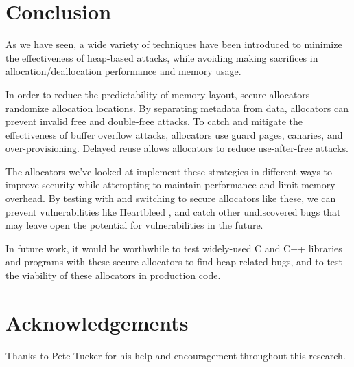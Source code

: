 \documentclass[conference]{IEEEtran}
\begin{document}
\section{Conclusion}

As we have seen, a wide variety of techniques have been introduced to minimize the effectiveness of heap-based attacks, while avoiding making sacrifices in allocation/deallocation performance and memory usage.

In order to reduce the predictability of memory layout, secure allocators randomize allocation locations.
By separating metadata from data, allocators can prevent invalid free and double-free attacks.
To catch and mitigate the effectiveness of buffer overflow attacks, allocators use guard pages, canaries, and over-provisioning.
Delayed reuse allows allocators to reduce use-after-free attacks.

The allocators we've looked at implement these strategies in different ways to improve security while attempting to maintain performance and limit memory overhead.
By testing with and switching to secure allocators like these, we can prevent vulnerabilities like Heartbleed \cite{guarder}, and catch other undiscovered bugs that may leave open the potential for vulnerabilities in the future.

In future work, it would be worthwhile to test widely-used C and C++ libraries and programs with these secure allocators to find heap-related bugs, and to test the viability of these allocators in production code.

\section*{Acknowledgements}

Thanks to Pete Tucker for his help and encouragement throughout this research.

\printbibliography
\end{document}
